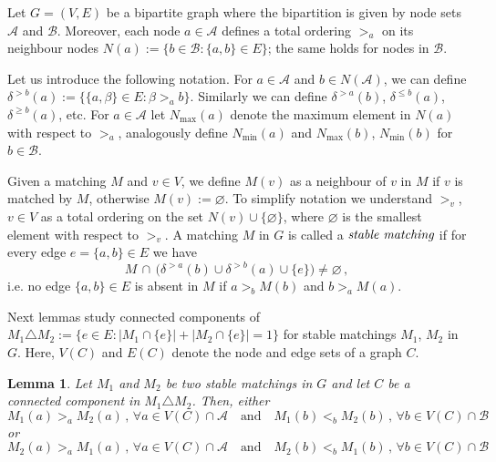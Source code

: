 \documentclass[preprint]{elsarticle}
\newtheorem{lemma}[fact]{Lemma}
\begin{document}
Let $G = (V, E)$ be a bipartite graph  where the bipartition is given by node sets $\mathcal{A}$ and $\mathcal{B}$. Moreover, each node $a\in\mathcal{A}$ defines a total ordering $>_a$ on its neighbour nodes $N(a):=\{b \in\mathcal{B}: \{a,b\}\in E\}$;  the same holds for nodes in $\mathcal{B}$.

Let us introduce the following notation. For $a\in \mathcal{A}$ and $b \in N(\mathcal{A})$, we can define $\delta^{>b}(a):=\{ \{a,\beta\}\in E: \beta>_a b \}$. Similarly we can define $\delta^{>a}(b)$, $\delta^{\leq b}(a)$, $\delta^{\geq b}(a)$, etc. For $a\in \mathcal{A}$ let $N_{\max}(a)$ denote the maximum element in $N(a)$ with respect to $>_a$, analogously define $N_{\min}(a)$ and $N_{\max}(b)$, $N_{\min}(b)$ for $b\in\mathcal{B}$. 

Given a matching $M$ and $v\in V$, we define $M(v)$ as a neighbour of $v$ in $M$ if $v$ is matched by $M$, otherwise $M(v):=\varnothing$. To simplify notation we understand $>_v$, $v\in V$ as a total ordering on the set $N(v)\cup\{\varnothing\}$, where $\varnothing$ is the smallest element with respect to $>_v$.
A matching $M$ in $G$ is called a $\emph{stable matching}$ if for every edge $e=\{a,b\}\in E$ we have
\begin{equation}\label{eq:stability_def}
		M \, \cap \, \big(\delta^{>a}(b) \cup \delta^{>b}(a) \cup  \{e\} \big)\neq\varnothing\,,
\end{equation}
i.e. no edge $\{a,b\}\in E$ is absent in $M$  if $a>_b M(b)$ and $b>_a M(a)$.


Next lemmas study connected components of $M_1\triangle M_2:=\{ e\in E: |M_1\cap \{e\}|+|M_2\cap \{e\}|=1\}$ for stable matchings $M_1$, $M_2$ in $G$. Here, $V(C)$ and $E(C)$ denote the node and edge sets of a graph $C$.

\begin{lemma}\label{lemma:pref}
Let $M_1$ and $M_2$ be two stable matchings in $G$ and let $C$ be a connected component in $M_1 \triangle M_2$. Then, either
\begin{equation}\label{eq:pref_first}
	M_1(a)>_a M_2(a)\,,\,\forall a\in V(C) \cap\mathcal{A}\quad \text{and} \quad  M_1(b)<_b M_2(b)\,,\,  \forall b\in V(C) \cap\mathcal{B}
\end{equation}
or 
\begin{equation}\label{eq:pref_second}
	M_2(a)>_a M_1(a)\,,\,\forall a\in V(C) \cap\mathcal{A}\quad \text{and} \quad  M_2(b)<_b M_1(b)\,,\,  \forall b\in V(C) \cap\mathcal{B}
\end{equation}
\end{lemma}
\end{document}
